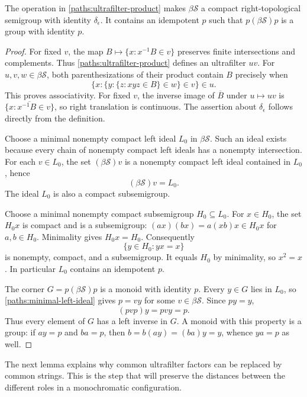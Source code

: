 \begin{lemma}\label{paths:corner-group}
The operation in \eqref{paths:ultrafilter-product} makes
$\beta\mathcal S$ a compact right-topological semigroup with identity
$\delta_\epsilon$. It contains an idempotent $p$ such that
$p(\beta\mathcal S)p$ is a group with identity $p$.
\end{lemma}

\begin{proof}
For fixed $v$, the map $B\mapsto\{x:x^{-1}B\in v\}$ preserves
finite intersections and complements. Thus
\eqref{paths:ultrafilter-product} defines an ultrafilter $uv$.
For $u,v,w\in\beta\mathcal S$, both parenthesizations of their
product contain $B$ precisely when
\[
\{x:\{y:\{z:xyz\in B\}\in w\}\in v\}\in u.
\]
This proves associativity. For fixed $v$, the inverse image of
$\overline B$ under $u\mapsto uv$ is
$\overline{\{x:x^{-1}B\in v\}}$, so right translation is
continuous. The assertion about $\delta_\epsilon$ follows directly
from the definition.

Choose a minimal nonempty compact left ideal $L_0$ in
$\beta\mathcal S$. Such an ideal exists because every chain of
nonempty compact left ideals has a nonempty intersection. For each
$v\in L_0$, the set $(\beta\mathcal S)v$ is a nonempty compact
left ideal contained in $L_0$, hence
\begin{equation}\label{paths:minimal-left-ideal}
(\beta\mathcal S)v=L_0.
\end{equation}
The ideal $L_0$ is also a compact subsemigroup.

Choose a minimal nonempty compact subsemigroup $H_0\subseteq L_0$.
For $x\in H_0$, the set $H_0x$ is compact and is a subsemigroup:
$(ax)(bx)=a(xb)x\in H_0x$ for $a,b\in H_0$.
Minimality gives $H_0x=H_0$. Consequently
\[
\{y\in H_0:yx=x\}
\]
is nonempty, compact, and a subsemigroup. It equals $H_0$ by
minimality, so $x^2=x$. In particular $L_0$ contains an idempotent
$p$.

The corner $G=p(\beta\mathcal S)p$ is a monoid with identity $p$.
Every $y\in G$ lies in $L_0$, so \eqref{paths:minimal-left-ideal}
gives $p=vy$ for some $v\in\beta\mathcal S$. Since $py=y$,
\[
(pvp)y=pvy=p.
\]
Thus every element of $G$ has a left inverse in $G$. A monoid with
this property is a group: if $ay=p$ and $ba=p$, then
$b=b(ay)=(ba)y=y$, whence $ya=p$ as well.
\end{proof}

The next lemma explains why common ultrafilter factors can be replaced
by common strings. This is the step that will preserve the distances
between the different roles in a monochromatic configuration.

